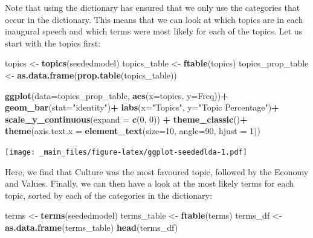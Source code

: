 \documentclass[
]{book}
\newenvironment{Shaded}{\begin{snugshade}}{\end{snugshade}}
\newcommand{\AttributeTok}[1]{\textcolor[rgb]{0.13,0.29,0.53}{#1}}
\newcommand{\DecValTok}[1]{\textcolor[rgb]{0.00,0.00,0.81}{#1}}
\newcommand{\FunctionTok}[1]{\textcolor[rgb]{0.13,0.29,0.53}{\textbf{#1}}}
\newcommand{\NormalTok}[1]{#1}
\newcommand{\OtherTok}[1]{\textcolor[rgb]{0.56,0.35,0.01}{#1}}
\newcommand{\SpecialCharTok}[1]{\textcolor[rgb]{0.81,0.36,0.00}{\textbf{#1}}}
\newcommand{\StringTok}[1]{\textcolor[rgb]{0.31,0.60,0.02}{#1}}
\begin{document}
Note that using the dictionary has ensured that we only use the categories that occur in the dictionary. This means that we can look at which topics are in each inaugural speech and which terms were most likely for each of the topics. Let us start with the topics first:

\begin{Shaded}
\begin{Highlighting}[]
\NormalTok{topics }\OtherTok{\textless{}{-}} \FunctionTok{topics}\NormalTok{(seededmodel)}
\NormalTok{topics\_table }\OtherTok{\textless{}{-}} \FunctionTok{ftable}\NormalTok{(topics)}
\NormalTok{topics\_prop\_table }\OtherTok{\textless{}{-}} \FunctionTok{as.data.frame}\NormalTok{(}\FunctionTok{prop.table}\NormalTok{(topics\_table))}

\FunctionTok{ggplot}\NormalTok{(}\AttributeTok{data=}\NormalTok{topics\_prop\_table, }\FunctionTok{aes}\NormalTok{(}\AttributeTok{x=}\NormalTok{topics, }\AttributeTok{y=}\NormalTok{Freq))}\SpecialCharTok{+}
 \FunctionTok{geom\_bar}\NormalTok{(}\AttributeTok{stat=}\StringTok{"identity"}\NormalTok{)}\SpecialCharTok{+}
 \FunctionTok{labs}\NormalTok{(}\AttributeTok{x=}\StringTok{"Topics"}\NormalTok{, }\AttributeTok{y=}\StringTok{"Topic Percentage"}\NormalTok{)}\SpecialCharTok{+}
 \FunctionTok{scale\_y\_continuous}\NormalTok{(}\AttributeTok{expand =} \FunctionTok{c}\NormalTok{(}\DecValTok{0}\NormalTok{, }\DecValTok{0}\NormalTok{)) }\SpecialCharTok{+}
 \FunctionTok{theme\_classic}\NormalTok{()}\SpecialCharTok{+}
 \FunctionTok{theme}\NormalTok{(}\AttributeTok{axis.text.x =} \FunctionTok{element\_text}\NormalTok{(}\AttributeTok{size=}\DecValTok{10}\NormalTok{, }\AttributeTok{angle=}\DecValTok{90}\NormalTok{, }\AttributeTok{hjust =} \DecValTok{1}\NormalTok{))}
\end{Highlighting}
\end{Shaded}

\texttt{[image: \_main\_files/figure-latex/ggplot-seededlda-1.pdf]}

Here, we find that Culture was the most favoured topic, followed by the Economy and Values. Finally, we can then have a look at the most likely terms for each topic, sorted by each of the categories in the dictionary:

\begin{Shaded}
\begin{Highlighting}[]
\NormalTok{terms }\OtherTok{\textless{}{-}} \FunctionTok{terms}\NormalTok{(seededmodel)}
\NormalTok{terms\_table }\OtherTok{\textless{}{-}} \FunctionTok{ftable}\NormalTok{(terms)}
\NormalTok{terms\_df }\OtherTok{\textless{}{-}} \FunctionTok{as.data.frame}\NormalTok{(terms\_table)}
\FunctionTok{head}\NormalTok{(terms\_df)}
\end{Highlighting}
\end{Shaded}
\end{document}
